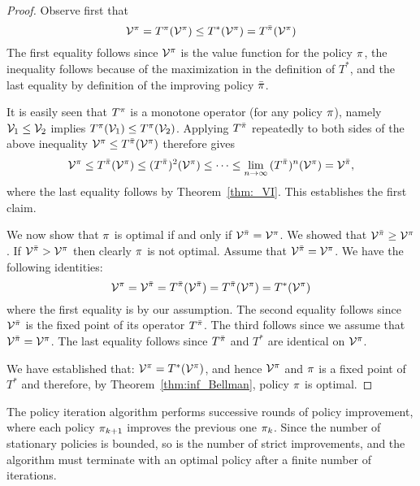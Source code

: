 \begin{proof} Observe first that
\[{\mathcal{V}^\pi } = T_{}^\pi ({\mathcal{V}^\pi }) \le T_{}^*({\mathcal{V}^\pi }) = T_{}^{\bar {\pi} }({\mathcal{V}^\pi })\]
The first equality follows since ${\mathcal{V}^\pi }$ is the value
function for the policy $\pi $, the inequality follows because
of the maximization in the definition of  $T_{}^*$, and the last
equality by definition of the improving policy $\bar {\pi} $.

It is easily seen that $T_{}^\pi $ is a monotone operator (for
any policy $\pi $), namely ${\mathcal{V}_1} \le {\mathcal{V}_2}$ implies
$T_{}^\pi (\mathcal{V}_1) \le T_{}^\pi (\mathcal{V}_2)$. Applying
$T^{\bar {\pi} }$ repeatedly to both sides of the above inequality
${\mathcal{V}^\pi } \le T_{}^{\bar {\pi} }(\mathcal{V}^\pi)$
therefore gives
\[{\mathcal{V}^\pi } \le T_{}^{\bar {\pi} }({\mathcal{V}^\pi }) \le {(T_{}^{\bar {\pi}})^2}({\mathcal{V}^\pi }) \le  \cdots  \le \mathop {\lim }\limits_{n \to \infty } {(T_{}^{\bar {\pi} })^n}({\mathcal{V}^\pi }) = {\mathcal{V}^{\bar {\pi} }},\]
where the last equality follows by Theorem~\ref{thm:_VI}.
This establishes the first claim.

We now show that $\pi$ is optimal if and only if ${\mathcal{V}^{\bar
{\pi} }} ={\mathcal{V}^\pi }$. We showed that ${\mathcal{V}^{\bar
{\pi} }} \ge {\mathcal{V}^\pi}$. If ${\mathcal{V}^{\bar {\pi} }} >
{\mathcal{V}^\pi }$ then clearly $\pi$ is not optimal. Assume
that ${\mathcal{V}^{\bar {\pi} }} = {\mathcal{V}^\pi }$. We have the
following identities:
\[
\mathcal{V}^{ \pi }= \mathcal{V}^{\bar {\pi} } = T^{\bar {\pi}}(\mathcal{V}^{\bar {\pi} })=T^{\bar {\pi} }(\mathcal{V}^{\pi})
=T^*(\mathcal{V}^{ \pi })
\]
where the first equality is by our assumption. The second equality
follows since $\mathcal{V}^{\bar {\pi} } $ is the fixed point of its
operator $T^{\bar {\pi} }$. The third follows since we assume that
${\mathcal{V}^{\bar {\pi} }} = {\mathcal{V}^\pi }$. The last equality
follows since $T^{\bar {\pi} }$ and $T^{* }$ are identical on
${\mathcal{V}^\pi }$.

We have established that: $\mathcal{V}^{ \pi } =T^*(\mathcal{V}^{ \pi
})$, and hence $\mathcal{V}^{ \pi }$ and $\pi$ is a fixed point
of $T^*$ and therefore, by Theorem~\ref{thm:inf_Bellman}, policy
$\pi $ is optimal.
\end{proof}

The policy iteration algorithm performs successive rounds of policy
improvement, where each policy ${\pi _{k + 1}}$ improves the
previous one ${\pi _k}$. Since the number of stationary policies
is bounded, so is the number of strict improvements, and the
algorithm must terminate with an optimal policy after a finite
number of iterations.

